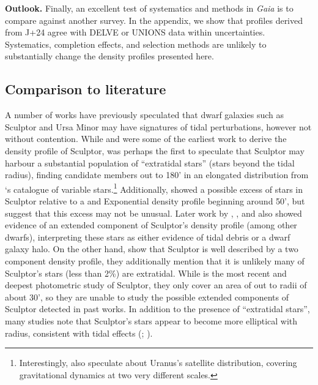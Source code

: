 \textbf{Outlook.} Finally, an excellent test of systematics and methods
in \emph{Gaia} is to compare against another survey. In the appendix, we
show that profiles derived from J+24 agree with DELVE or UNIONS data
within uncertainties. Systematics, completion effects, and selection
methods are unlikely to substantially change the density profiles
presented here.

\subsection{Comparison to literature}\label{comparison-to-literature}

A number of works have previously speculated that dwarf galaxies such as
Sculptor and Ursa Minor may have signatures of tidal perturbations,
however not without contention. While \citet{hodge1961} and
\citet{demers+krautter+kunkel1980} were some of the earliest work to
derive the density profile of Sculptor, \citet{innanen+papp1979} was
perhaps the first to speculate that Sculptor may harbour a substantial
population of ``extratidal stars'' (stars beyond the tidal radius),
finding candidate members out to 180' in an elongated distribution from
\citet{vanagt1978}`s catalogue of variable stars.\footnote{Interestingly,
  \citet{innanen+papp1979} also speculate about Uranus's satellite
  distribution, covering gravitational dynamics at two very different
  scales.} Additionally, \citet{eskridge1988} showed a possible excess
of stars in Sculptor relative to a \citet{king1962} and Exponential
density profile beginning around 50', but suggest that this excess may
not be unusual. Later work by \citet{IH1995}, \citet{walcher+2003}, and
\citet{westfall+2006} also showed evidence of an extended component of
Sculptor's density profile (among other dwarfs), interpreting these
stars as either evidence of tidal debris or a dwarf galaxy halo. On the
other hand, \citet{coleman+dacosta+bland-hawthorn2005} show that
Sculptor is well described by a two component density profile, they
additionally mention that it is unlikely many of Sculptor's stars (less
than 2\%) are extratidal. While \citet{munoz+2018} is the most recent
and deepest photometric study of Sculptor, they only cover an area of
out to radii of about 30', so they are unable to study the possible
extended components of Sculptor detected in past works. In addition to
the presence of ``extratidal stars'', many studies note that Sculptor's
stars appear to become more elliptical with radius, consistent with
tidal effects (\citet{IH1995}; \citet{westfall+2006}).

